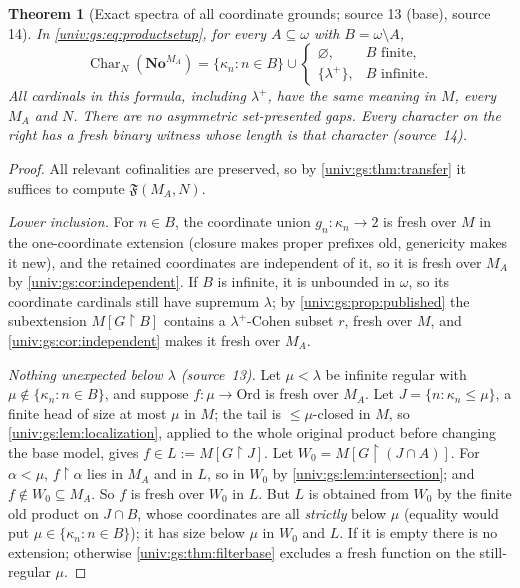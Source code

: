 \documentclass[11pt,letterpaper]{article}
\numberwithin{equation}{section}
\newtheorem{theorem}{Theorem}[section]
\theoremstyle{definition}
\theoremstyle{remark}
\newcommand{\No}{\mathbf{No}}
\newcommand{\Ord}{\mathrm{Ord}}
\newcommand{\res}{\mathbin{\upharpoonright}}
\newcommand{\Char}{\operatorname{Char}}
\newcommand{\FF}{\mathfrak F}
\begin{document}
\begin{theorem}[Exact spectra of all coordinate grounds; source 13 (base), source 14]\label{univ:gs:thm:coordinate}
In \eqref{univ:gs:eq:productsetup}, for every $A\subseteq\omega$ with $B=\omega\setminus A$,
\[
 \Char_N(\No^{M_A})=\{\kappa_n:n\in B\}\cup
 \begin{cases}\varnothing,&B\text{ finite},\\ \{\lambda^+\},&B\text{ infinite}.\end{cases}
\]
All cardinals in this formula, including $\lambda^+$, have the same meaning in $M$, every
$M_A$ and $N$. There are no asymmetric set-presented gaps. Every character on the right
has a fresh \emph{binary} witness whose length is that character (source~14).
\end{theorem}

\begin{proof}
All relevant cofinalities are preserved, so by \cref{univ:gs:thm:transfer} it suffices to
compute $\FF(M_A,N)$.

\emph{Lower inclusion.} For $n\in B$, the coordinate union $g_n:\kappa_n\to2$ is fresh over
$M$ in the one-coordinate extension (closure makes proper prefixes old, genericity makes it
new), and the retained coordinates are independent of it, so it is fresh over $M_A$ by
\cref{univ:gs:cor:independent}. If $B$ is infinite, it is unbounded in $\omega$, so its
coordinate cardinals still have supremum $\lambda$; by \cref{univ:gs:prop:published} the
subextension $M[G\res B]$ contains a $\lambda^+$-Cohen subset $r$, fresh over $M$, and
\cref{univ:gs:cor:independent} makes it fresh over $M_A$.

\emph{Nothing unexpected below $\lambda$ (source~13).} Let $\mu<\lambda$ be infinite regular
with $\mu\notin\{\kappa_n:n\in B\}$, and suppose $f:\mu\to\Ord$ is fresh over $M_A$. Let
$J=\{n:\kappa_n\le\mu\}$, a finite head of size at most $\mu$ in $M$; the tail is
$\le\mu$-closed in $M$, so \cref{univ:gs:lem:localization}, applied to the whole original
product before changing the base model, gives $f\in L:=M[G\res J]$. Let
$W_0=M[G\res(J\cap A)]$. For $\alpha<\mu$, $f\res\alpha$ lies in $M_A$ and in $L$, so in
$W_0$ by \cref{univ:gs:lem:intersection}; and $f\notin W_0\subseteq M_A$. So $f$ is fresh
over $W_0$ in $L$. But $L$ is obtained from $W_0$ by the finite old product on $J\cap B$,
whose coordinates are all \emph{strictly} below $\mu$ (equality would put
$\mu\in\{\kappa_n:n\in B\}$); it has size below $\mu$ in $W_0$ and $L$. If it is empty
there is no extension; otherwise \cref{univ:gs:thm:filterbase} excludes a fresh function
on the still-regular $\mu$.


\end{proof}
\end{document}

